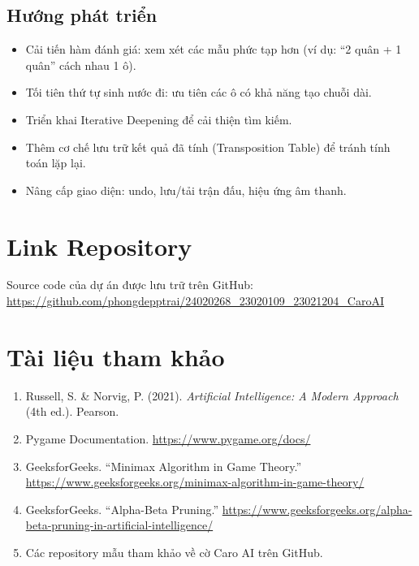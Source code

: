 \documentclass[12pt,a4paper]{article}
\begin{document}
\subsection{Hướng phát triển}

\begin{itemize}
    \item Cải tiến hàm đánh giá: xem xét các mẫu phức tạp hơn (ví dụ: ``2 quân + 1 quân'' cách nhau 1 ô).
    \item Tối tiên thứ tự sinh nước đi: ưu tiên các ô có khả năng tạo chuỗi dài.
    \item Triển khai Iterative Deepening để cải thiện tìm kiếm.
    \item Thêm cơ chế lưu trữ kết quả đã tính (Transposition Table) để tránh tính toán lặp lại.
    \item Nâng cấp giao diện: undo, lưu/tải trận đấu, hiệu ứng âm thanh.
\end{itemize}

\section{Link Repository}

Source code của dự án được lưu trữ trên GitHub:\\
\url{https://github.com/phongdepptrai/24020268_23020109_23021204_CaroAI}

\section{Tài liệu tham khảo}

\begin{enumerate}
    \item Russell, S. \& Norvig, P. (2021). \textit{Artificial Intelligence: A Modern Approach} (4th ed.). Pearson.
    \item Pygame Documentation. \url{https://www.pygame.org/docs/}
    \item GeeksforGeeks. ``Minimax Algorithm in Game Theory.'' \url{https://www.geeksforgeeks.org/minimax-algorithm-in-game-theory/}
    \item GeeksforGeeks. ``Alpha-Beta Pruning.'' \url{https://www.geeksforgeeks.org/alpha-beta-pruning-in-artificial-intelligence/}
    \item Các repository mẫu tham khảo về cờ Caro AI trên GitHub.
\end{enumerate}
\end{document}
